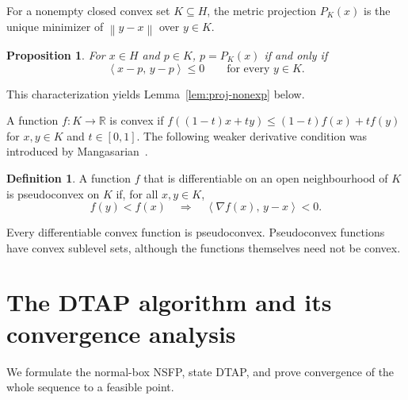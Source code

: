 \documentclass[]{interact}
\theoremstyle{plain}
\newtheorem{proposition}[theorem]{Proposition}
\theoremstyle{definition}
\newtheorem{definition}[theorem]{Definition}
\theoremstyle{remark}
\newcommand{\R}{\mathbb{R}}
\newcommand{\norm}[1]{\left\lVert #1 \right\rVert}
\newcommand{\inner}[2]{\left\langle #1,\, #2 \right\rangle}
\begin{document}
For a nonempty closed convex set $K\subseteq H$, the metric projection $P_K(x)$ is the unique minimizer of $\norm{y-x}$ over $y\in K$.
\begin{proposition}\label{prop:proj-char}
For $x\in H$ and $p\in K$, $p=P_K(x)$ if and only if
\begin{equation}\label{eq:proj-char}
\inner{x-p}{y-p}\le0\qquad\text{for every }y\in K.
\end{equation}
\end{proposition}
This characterization yields Lemma~\ref{lem:proj-nonexp} below.

A function $f:K\to\R$ is convex if
$f((1-t)x+ty)\le(1-t)f(x)+tf(y)$ for $x,y\in K$ and $t\in[0,1]$.
The following weaker derivative condition was introduced by Mangasarian~\citep{mangasarian1965}.
\begin{definition}\label{def:pseudoconvex}
A function $f$ that is differentiable on an open neighbourhood of $K$ is pseudoconvex on $K$ if, for all $x,y\in K$,
\begin{equation}\label{eq:contrapositive}
f(y)<f(x)\quad\Longrightarrow\quad\inner{\nabla f(x)}{y-x}<0.
\end{equation}
\end{definition}
Every differentiable convex function is pseudoconvex. Pseudoconvex functions have convex sublevel sets, although the functions themselves need not be convex.

\section{The DTAP algorithm and its convergence analysis}\label{sec:convergence}
We formulate the normal-box NSFP, state DTAP, and prove convergence of the whole sequence
to a feasible point.
\end{document}
